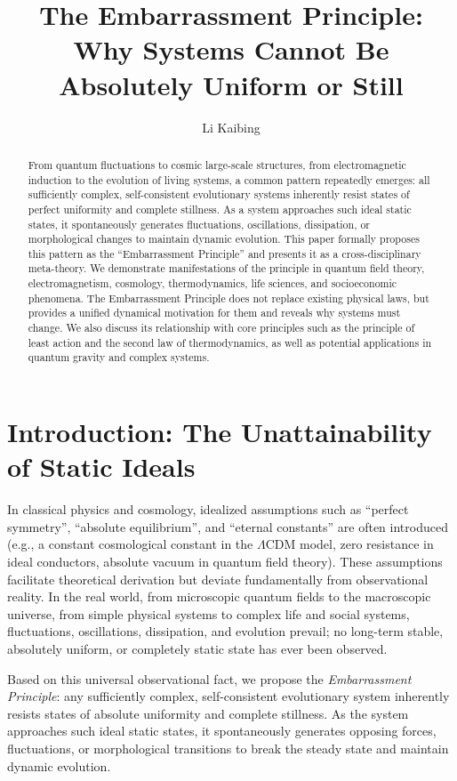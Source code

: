 \documentclass[10pt,a4paper]{article}
\title{The Embarrassment Principle: \\ Why Systems Cannot Be Absolutely Uniform or Still}
\author{Li Kaibing}
\affil{Independent Researcher}
\date{}
\begin{document}
\maketitle

\begin{abstract}
From quantum fluctuations to cosmic large-scale structures, from electromagnetic induction to the evolution of living systems, a common pattern repeatedly emerges: all sufficiently complex, self-consistent evolutionary systems inherently resist states of perfect uniformity and complete stillness. As a system approaches such ideal static states, it spontaneously generates fluctuations, oscillations, dissipation, or morphological changes to maintain dynamic evolution. This paper formally proposes this pattern as the ``Embarrassment Principle'' and presents it as a cross-disciplinary meta-theory. We demonstrate manifestations of the principle in quantum field theory, electromagnetism, cosmology, thermodynamics, life sciences, and socioeconomic phenomena. The Embarrassment Principle does not replace existing physical laws, but provides a unified dynamical motivation for them and reveals why systems must change. We also discuss its relationship with core principles such as the principle of least action and the second law of thermodynamics, as well as potential applications in quantum gravity and complex systems.
\end{abstract}

\section{Introduction: The Unattainability of Static Ideals}
In classical physics and cosmology, idealized assumptions such as ``perfect symmetry'', ``absolute equilibrium'', and ``eternal constants'' are often introduced (e.g., a constant cosmological constant in the $\Lambda$CDM model, zero resistance in ideal conductors, absolute vacuum in quantum field theory). These assumptions facilitate theoretical derivation but deviate fundamentally from observational reality. In the real world, from microscopic quantum fields to the macroscopic universe, from simple physical systems to complex life and social systems, fluctuations, oscillations, dissipation, and evolution prevail; no long-term stable, absolutely uniform, or completely static state has ever been observed.

Based on this universal observational fact, we propose the \emph{Embarrassment Principle}: any sufficiently complex, self-consistent evolutionary system inherently resists states of absolute uniformity and complete stillness. As the system approaches such ideal static states, it spontaneously generates opposing forces, fluctuations, or morphological transitions to break the steady state and maintain dynamic evolution.
\end{document}
